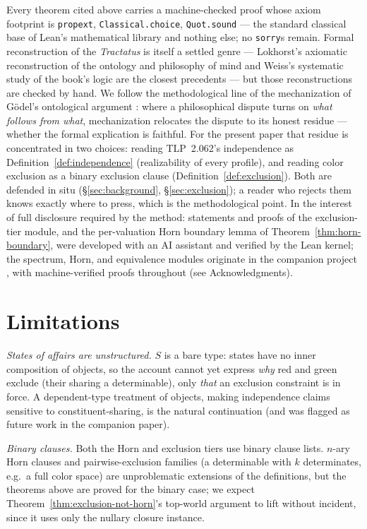 \documentclass[10pt, letterpaper]{article}
\theoremstyle{remark}
\newcommand{\lean}[1]{\texttt{#1}}
\newcommand{\TLP}[1]{TLP~#1}
\begin{document}
Every theorem cited above carries a machine-checked proof whose axiom
footprint is \lean{propext}, \lean{Classical.choice}, \lean{Quot.sound} ---
the standard classical base of Lean's mathematical library and nothing else;
no \lean{sorry}s remain. Formal reconstruction of the \emph{Tractatus} is
itself a settled genre --- Lokhorst's axiomatic reconstruction of the
ontology and philosophy of mind \cite{lokhorst1988} and Weiss's systematic
study of the book's logic \cite{weiss2017} are the closest precedents ---
but those reconstructions are checked by hand. We follow the methodological
line of the mechanization of G\"odel's ontological argument
\cite{benzmuller2014}: where a philosophical dispute turns on \emph{what
follows from what}, mechanization relocates the dispute to its honest
residue --- whether the formal explication is faithful. For the present paper that residue is concentrated
in two choices: reading \TLP{2.062}'s independence as
Definition~\ref{def:independence} (realizability of every profile), and
reading color exclusion as a binary exclusion clause
(Definition~\ref{def:exclusion}). Both are defended in situ
(\S\ref{sec:background}, \S\ref{sec:exclusion}); a reader who rejects them
knows exactly where to press, which is the methodological point. In the
interest of full disclosure required by the method: statements and proofs of
the exclusion-tier module, and the per-valuation Horn boundary lemma of
Theorem~\ref{thm:horn-boundary}, were developed with an AI assistant and
verified by the Lean kernel; the spectrum, Horn, and equivalence modules
originate in the companion project \cite{companion2026}, with
machine-verified proofs throughout (see Acknowledgments).

\section{Limitations}\label{sec:limitations}

\emph{States of affairs are unstructured.} $S$ is a bare type: states have
no inner composition of objects, so the account cannot yet express
\emph{why} red and green exclude (their sharing a determinable), only
\emph{that} an exclusion constraint is in force. A dependent-type treatment
of objects, making independence claims sensitive to constituent-sharing, is
the natural continuation (and was flagged as future work in the companion
paper).

\emph{Binary clauses.} Both the Horn and exclusion tiers use binary clause
lists. $n$-ary Horn clauses and pairwise-exclusion families (a determinable
with $k$ determinates, e.g.\ a full color space) are unproblematic
extensions of the definitions, but the theorems above are proved for the
binary case; we expect Theorem~\ref{thm:exclusion-not-horn}'s top-world
argument to lift without incident, since it uses only the nullary closure
instance.
\end{document}
